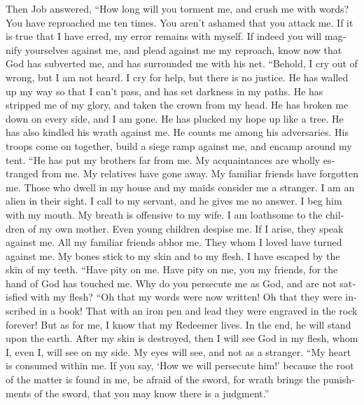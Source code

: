 \begin{paracol}{2}
\begin{otherlanguage}{english}
 Then Job answered,  ``How long will you
torment me, and crush me with words?  You have reproached
me ten times. You aren't ashamed that you attack me.  If
it is true that I have erred, my error remains with myself.
 If indeed you will magnify yourselves against me, and
plead against me my reproach,  know now that God has
subverted me, and has surrounded me with his net. 
``Behold, I cry out of wrong, but I am not heard. I cry for help, but
there is no justice.  He has walled up my way so that I
can't pass, and has set darkness in my paths.  He has
stripped me of my glory, and taken the crown from my head.
 He has broken me down on every side, and I am gone. He
has plucked my hope up like a tree.  He has also kindled
his wrath against me. He counts me among his adversaries.
 His troops come on together, build a siege ramp against
me, and encamp around my tent.  ``He has put my brothers
far from me. My acquaintances are wholly estranged from me.
 My relatives have gone away. My familiar friends have
forgotten me.  Those who dwell in my house and my maids
consider me a stranger. I am an alien in their sight.  I
call to my servant, and he gives me no answer. I beg him with my mouth.
 My breath is offensive to my wife. I am loathsome to the
children of my own mother.  Even young children despise
me. If I arise, they speak against me.  All my familiar
friends abhor me. They whom I loved have turned against me.
 My bones stick to my skin and to my flesh. I have
escaped by the skin of my teeth.  ``Have pity on me. Have
pity on me, you my friends, for the hand of God has touched me.
 Why do you persecute me as God, and are not satisfied
with my flesh?  ``Oh that my words were now written! Oh
that they were inscribed in a book!  That with an iron
pen and lead they were engraved in the rock forever!  But
as for me, I know that my Redeemer lives. In the end, he will stand upon
the earth.  After my skin is destroyed, then I will see
God in my flesh,  whom I, even I, will see on my side. My
eyes will see, and not as a stranger. ``My heart is consumed within me.
 If you say, `How we will persecute him!' because the
root of the matter is found in me,  be afraid of the
sword, for wrath brings the punishments of the sword, that you may know
there is a judgment.''


\end{otherlanguage}
\end{paracol}
